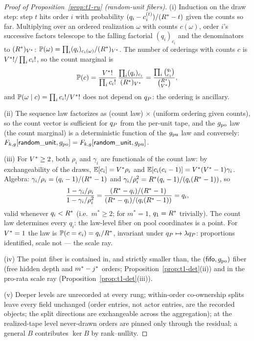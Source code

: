 
\begin{proof}[Proof of Proposition~\ref{prop:t1-ru} (random-unit fibers)]
(i) Induction on the draw step: step $t$ hits order $i$ with probability
$(q_i - c_i^{(t)})/(R^{*} - t)$ given the counts so far. Multiplying over
an ordered realization $\omega$ with counts $c(\omega)$, order $i$'s
successive factors telescope to the falling factorial $(q_i)_{c_i}$ and the
denominators to $(R^{*})_{V^{*}}$:
$\mathbb{P}(\omega) = \prod_i (q_i)_{c_i(\omega)}/(R^{*})_{V^{*}}$.
The number of orderings with counts $c$ is
$V^{*}!/\prod_i c_i!$, so the count marginal is
\[
\mathbb{P}(c) = \frac{V^{*}!}{\prod_i c_i!}\,
\frac{\prod_i (q_i)_{c_i}}{(R^{*})_{V^{*}}}
= \frac{\prod_i \binom{q_i}{c_i}}{\binom{R^{*}}{V^{*}}} ,
\]
and $\mathbb{P}(\omega \mid c) = \prod_i c_i!/V^{*}!$ does not depend on
$q_{P}$: the ordering is ancillary.

(ii) The sequence law factorizes as (count law) $\times$ (uniform
ordering given counts), so the count vector is sufficient for $q_{P}$ from
the per-unit tape, and the $g_{\mathrm{po}}$ law (the count marginal) is a
deterministic function of the $g_{\mathrm{pu}}$ law and conversely:
$F_{k,g}[\mathsf{random\_unit},g_{\mathrm{po}}] = F_{k,g}[\mathsf{random\_unit},g_{\mathrm{pu}}]$.

(iii) For $V^{*} \geq 2$, both $\rho_i$ and $\gamma_i$ are functionals of
the count law: by exchangeability of the draws, $\mathbb{E}[c_i] = V^{*}
\rho_i$ and $\mathbb{E}[c_i(c_i - 1)] = V^{*}(V^{*} - 1)\gamma_i$.
Algebra:
$\gamma_i/\rho_i = (q_i - 1)/(R^{*} - 1)$ and
$\gamma_i/\rho_i^{2} = R^{*}(q_i - 1)/(q_i(R^{*} - 1))$, so
\[
\frac{1 - \gamma_i/\rho_i}{1 - \gamma_i/\rho_i^{2}}
= \frac{(R^{*} - q_i)/(R^{*} - 1)}
{(R^{*} - q_i)/(q_i(R^{*} - 1))} = q_i ,
\]
valid whenever $q_i < R^{*}$ (i.e.\ $m^{*} \geq 2$; for $m^{*} = 1$,
$q_1 = R^{*}$ trivially). The count law determines every $q_i$: the
law-level fiber on pool coordinates is a point. For $V^{*} = 1$ the law is
$\mathbb{P}(c = e_i) = q_i/R^{*}$, invariant under $q_{P} \mapsto
\lambda q_{P}$: proportions identified, scale not --- the scale ray.

(iv) The point fiber is contained in, and strictly smaller than, the
$(\mathsf{fifo},g_{\mathrm{po}})$ fiber (free hidden depth and $m^{*} - j^{*}$ orders;
Proposition~\ref{prop:t1-det}(ii)) and in the pro-rata scale ray
(Proposition~\ref{prop:t1-det}(iii)).

(v) Deeper levels are unrecorded at every rung; within-order co-ownership
splits leave every field unchanged (order entries, not actor entries, are
the recorded objects; the split directions are exchangeable across the
aggregation); at the realized-tape level never-drawn orders are pinned only
through the  residual; a general $B$ contributes
$\ker B$ by rank--nullity.
\end{proof}

